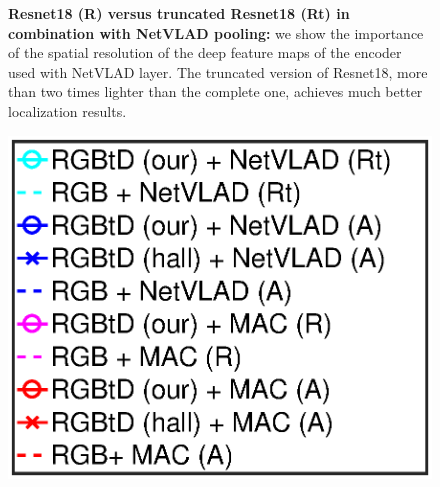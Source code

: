 \begin{figure}
\begin{minipage}{0.49\linewidth}
	\end{minipage}
	\caption{\label{fig:trunc_resnet} \textbf{Resnet18 (R) versus truncated Resnet18 (Rt) in combination with NetVLAD pooling:} we show the importance of the spatial resolution of the deep feature maps of the encoder used with NetVLAD layer. The truncated version of Resnet18, more than two times lighter than the complete one, achieves much better localization results.}
	\vspace{-0.25cm}
\end{figure}

\begin{figure}
	\center
	\begin{minipage}{0.14\linewidth}
		\includegraphics[trim={90 140 95 100},clip,width=\linewidth]{plot/fig/legend}	
	\end{minipage}
	\begin{minipage}{0.85\linewidth}
	

\end{minipage}
\end{figure}
